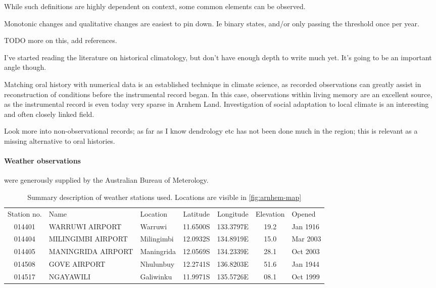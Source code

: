 While such definitions are highly dependent on context, some common
elements can be observed.

Monotonic changes and qualitative changes are easiest to pin down.
Ie binary states, and/or only passing the threshold once per year.

TODO more on this, add references.

I've started reading the literature on historical climatology, but don't have 
enough depth to write much yet.  It's going to be an important angle though. 

Matching oral history with numerical data is an established technique in 
climate science, as recorded observations can greatly assist in reconstruction 
of conditions before the instrumental record began.  In this case, observations 
within living memory are an excellent source, as the instrumental record is 
even today very sparse in Arnhem Land.  Investigation of social adaptation to 
local climate is an interesting and often closely linked field.

Look more into non-observational records; as far as I know dendrology etc has 
not been done much in the region; this is relevant as a missing alternative to 
oral histories.



\paragraph{Weather observations} were generously supplied by the
Australian Bureau of Meterology.

\begin{table}[h]
    \centering
    \begin{tabular}{cllcccl}
        Station no.  &  Name                &  Location     &  Latitude   &  Longitude   &  Elevation  &  Opened   \\
        014401       &  WARRUWI AIRPORT     &  Warruwi      &  11.6500S   &  133.3797E   &  19.2       &  Jan 1916 \\
        014404       &  MILINGIMBI AIRPORT  &  Milingimbi   &  12.0932S   &  134.8919E   &  15.0       &  Mar 2003 \\
        014405       &  MANINGRIDA AIRPORT  &  Maningrida   &  12.0569S   &  134.2339E   &  28.1       &  Oct 2003 \\
        014508       &  GOVE AIRPORT        &  Nhulunbuy    &  12.2741S   &  136.8203E   &  51.6       &  Jan 1944 \\
        014517       &  NGAYAWILI           &  Galiwinku    &  11.9971S   &  135.5726E   &  08.1       &  Oct 1999
    \end{tabular}
    \caption[List of weather stations providing data]{
        Summary description of weather stations used.
        Locations are visible in \autoref{fig:arnhem-map}}
    \label{tab:weather-station-summary}
\end{table}

